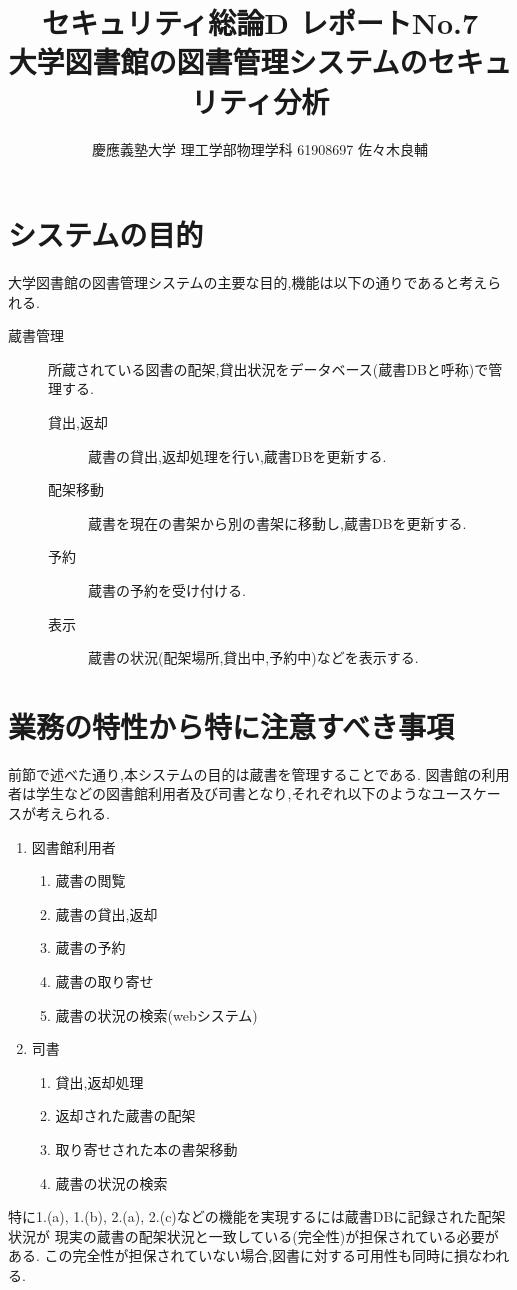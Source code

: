 \documentclass[uplatex,a4j,11pt,dvipdfmx]{jsarticle}
\begin{document}
\title{セキュリティ総論D レポートNo.7\\
\large 大学図書館の図書管理システムのセキュリティ分析}
\author{慶應義塾大学 理工学部物理学科 61908697 佐々木良輔}
\date{}
\maketitle
\section{システムの目的}
大学図書館の図書管理システムの主要な目的,機能は以下の通りであると考えられる.
\begin{description}
  \item[蔵書管理] 所蔵されている図書の配架,貸出状況をデータベース(蔵書DBと呼称)で管理する.
  \begin{description}
    \item[貸出,返却] 蔵書の貸出,返却処理を行い,蔵書DBを更新する.
    \item[配架移動] 蔵書を現在の書架から別の書架に移動し,蔵書DBを更新する.
    \item[予約] 蔵書の予約を受け付ける. 
    \item[表示] 蔵書の状況(配架場所,貸出中,予約中)などを表示する.
  \end{description}
\end{description}
\section{業務の特性から特に注意すべき事項}
前節で述べた通り,本システムの目的は蔵書を管理することである.
図書館の利用者は学生などの図書館利用者及び司書となり,それぞれ以下のようなユースケースが考えられる.
\begin{enumerate}
  \item 図書館利用者
  \begin{enumerate}
    \item 蔵書の閲覧
    \item 蔵書の貸出,返却
    \item 蔵書の予約
    \item 蔵書の取り寄せ
    \item 蔵書の状況の検索(webシステム)
  \end{enumerate}
  \item 司書
  \begin{enumerate}
    \item 貸出,返却処理
    \item 返却された蔵書の配架
    \item 取り寄せされた本の書架移動
    \item 蔵書の状況の検索
  \end{enumerate}
\end{enumerate}
特に1.(a), 1.(b), 2.(a), 2.(c)などの機能を実現するには蔵書DBに記録された配架状況が
現実の蔵書の配架状況と一致している(完全性)が担保されている必要がある.
この完全性が担保されていない場合,図書に対する可用性も同時に損なわれる.
\end{document}
